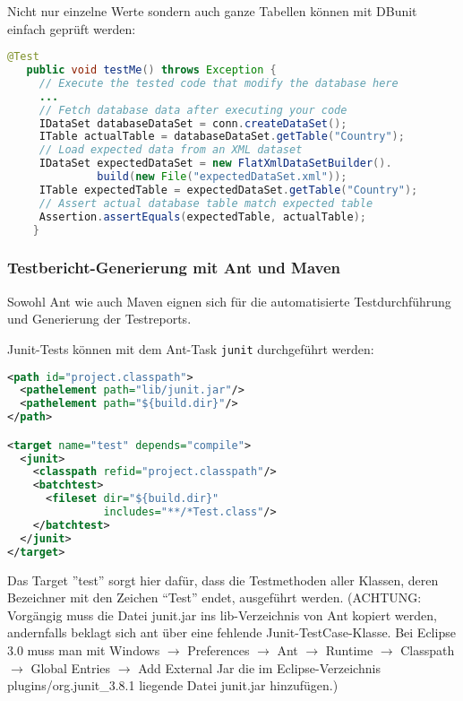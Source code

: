 \newslide
Nicht nur einzelne Werte sondern
auch ganze Tabellen können mit DBunit einfach geprüft werden:
\begin{lstlisting}[language=java]
   @Test
   public void testMe() throws Exception {
     // Execute the tested code that modify the database here
     ...
     // Fetch database data after executing your code
     IDataSet databaseDataSet = conn.createDataSet();
     ITable actualTable = databaseDataSet.getTable("Country");
     // Load expected data from an XML dataset
     IDataSet expectedDataSet = new FlatXmlDataSetBuilder().
              build(new File("expectedDataSet.xml"));
     ITable expectedTable = expectedDataSet.getTable("Country");
     // Assert actual database table match expected table
     Assertion.assertEquals(expectedTable, actualTable);
    }
\end{lstlisting}
%
%
\subsubsection{Testbericht-Generierung mit Ant und Maven}
Sowohl Ant wie auch Maven eignen sich für die automatisierte
Testdurchführung und Generierung der Testreports.

Junit-Tests können mit dem Ant-Task \verb+junit+ durchgeführt werden:
\begin{lstlisting}[language=xml,
  morekeywords={target,path,pathelement,junit,classpath,batchtest,fileset}]
<path id="project.classpath">
  <pathelement path="lib/junit.jar"/>
  <pathelement path="${build.dir}"/>
</path>

<target name="test" depends="compile">
  <junit>
    <classpath refid="project.classpath"/>
    <batchtest>
      <fileset dir="${build.dir}"
               includes="**/*Test.class"/>
    </batchtest>
  </junit>
</target>
\end{lstlisting}
Das Target ''test'' sorgt hier dafür, dass die Testmethoden aller Klassen,
deren Bezeichner mit den Zeichen ``Test'' endet, ausgeführt werden.
\ifslides
\else
(ACHTUNG: Vorgängig muss die Datei junit.jar ins lib-Verzeichnis von Ant
kopiert werden, andernfalls beklagt sich ant über eine fehlende
Junit-TestCase-Klasse. Bei Eclipse 3.0 muss man mit
Windows $\longrightarrow$ Preferences $\longrightarrow$ Ant $\longrightarrow$
 Runtime
  $\longrightarrow$ Classpath $\longrightarrow$
                Global Entries $\longrightarrow$ Add External Jar
die im Eclipse-Verzeichnis
  plugins/org.junit\_3.8.1
liegende Datei junit.jar  hinzufügen.)
\fi

